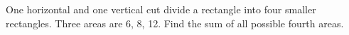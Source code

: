One horizontal and one vertical cut divide a rectangle into four smaller rectangles. Three areas are 6, 8, 12. Find the sum of all possible fourth areas.
